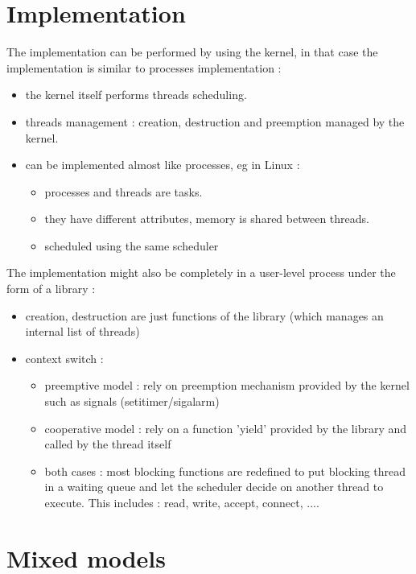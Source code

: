 \documentclass[a4paper,10pt]{article}
\begin{document}
\section{Implementation}

The implementation can be performed by using the kernel, in that case the implementation
is similar to processes implementation :

\begin{itemize}
\item the kernel itself performs threads scheduling.
\item threads management : creation, destruction and preemption managed by the kernel.
\item can be implemented almost like processes, eg in Linux :
\begin{itemize}
\item processes and threads are tasks.
\item they have different attributes, memory is shared between threads.
\item scheduled using the same scheduler
\end{itemize}
\end{itemize}

The implementation might also be completely in a user-level process under the form of a library :

\begin{itemize}
\item creation, destruction are just functions of the library (which manages an internal list of threads)
\item context switch :
\begin{itemize}
\item preemptive model : rely on preemption mechanism provided by  the kernel such as signals (setitimer/sigalarm)
\item cooperative model : rely on a function 'yield' provided by the library and called by the thread itself
\item both cases : most blocking functions are redefined to put blocking thread in a waiting queue and let the scheduler decide on another thread to execute. This includes : read, write, accept, connect, ....
\end{itemize}
\end{itemize}

\vspace{3cm}

\section{Mixed models}
\end{document}
